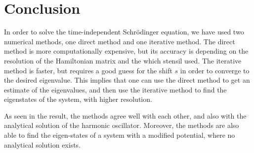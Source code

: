 \documentclass[a4paper]{article}
\newcommand{\newparagraph}{\vspace{.5cm}\noindent}
\begin{document}
\section{Conclusion}
In order to solve the time-independent Schrödinger equation, we have used two numerical methods, one direct method and one iterative method.
The direct method is more computationally expensive, but its accuracy is depending on the resolution of the Hamiltonian matrix and the which stensil used.
The iterative method is faster, but requires a good guess for the shift $s$ in order to converge to the desired eigenvalue.
This implies that one can use the direct method to get an estimate of the eigenvalues, and then use the iterative method to find the eigenstates of the system, with higher resolution.

\newparagraph
As seen in the result, the methods agree well with each other, and also with the analytical solution of the harmonic oscillator.
Moreover, the methods are also able to find the eigen-states of a system with a modified potential, where no analytical solution exists.
\end{document}
